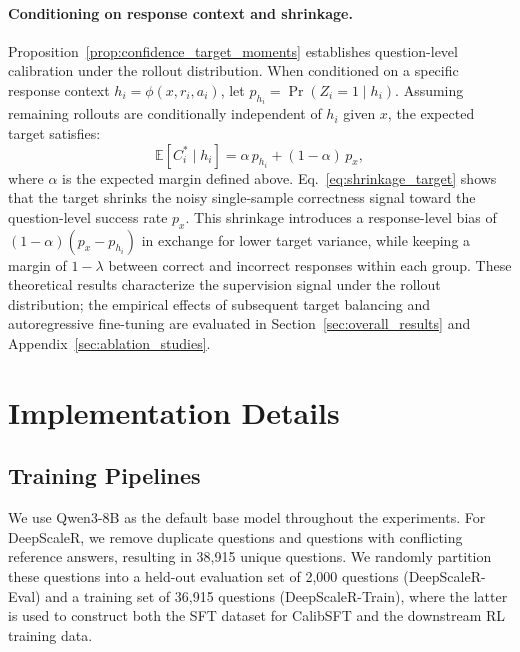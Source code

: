 \documentclass{article} %
\begin{document}
\paragraph{Conditioning on response context and shrinkage.}
Proposition~\ref{prop:confidence_target_moments} establishes question-level calibration under the rollout distribution.
When conditioned on a specific response context $h_i = \phi(x, r_i, a_i)$, let $p_{h_i} = \Pr(Z_i = 1 \mid h_i)$.
Assuming remaining rollouts are conditionally independent of $h_i$ given $x$, the expected target satisfies:
\begin{equation}
    \mathbb E[C_i^* \mid h_i] = \alpha \, p_{h_i} + (1 - \alpha) \, p_x,
    \label{eq:shrinkage_target}
\end{equation}
where $\alpha$ is the expected margin defined above.
Eq.~\eqref{eq:shrinkage_target} shows that the target shrinks the noisy single-sample correctness signal toward the question-level success rate $p_x$.
This shrinkage introduces a response-level bias of $(1-\alpha)(p_x - p_{h_i})$ in exchange for lower target variance, while keeping a margin of $1-\lambda$ between correct and incorrect responses within each group.
These theoretical results characterize the supervision signal under the rollout distribution; the empirical effects of subsequent target balancing and autoregressive fine-tuning are evaluated in Section~\ref{sec:overall_results} and Appendix~\ref{sec:ablation_studies}.

\section{Implementation Details}
\label{sec:detailed_setup}

\subsection{Training Pipelines}
\label{sec:training_pipelines}

We use Qwen3-8B as the default base model throughout the experiments.
For DeepScaleR, we remove duplicate questions 
and questions with conflicting reference answers,
resulting in 38{,}915 unique questions.
We randomly partition these questions into 
a held-out evaluation set of 2{,}000 questions (DeepScaleR-Eval) 
and a training set of 36{,}915 questions (DeepScaleR-Train), 
where the latter is used to construct both the SFT dataset for CalibSFT and the downstream RL training data.
\end{document}
